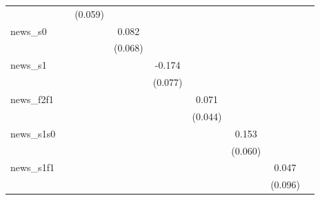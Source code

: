 {\begin{tabular}{l*{8}{c}}
            &                     &     (0.059)         &                     &                     &                     &                     &                     &                     \\
\addlinespace
news\_s0     &                     &                     &       0.082         &                     &                     &                     &                     &                     \\
            &                     &                     &     (0.068)         &                     &                     &                     &                     &                     \\
\addlinespace
news\_s1     &                     &                     &                     &      -0.174\sym{**} &                     &                     &                     &                     \\
            &                     &                     &                     &     (0.077)         &                     &                     &                     &                     \\
\addlinespace
news\_f2f1   &                     &                     &                     &                     &       0.071         &                     &                     &                     \\
            &                     &                     &                     &                     &     (0.044)         &                     &                     &                     \\
\addlinespace
news\_s1s0   &                     &                     &                     &                     &                     &       0.153\sym{**} &                     &                     \\
            &                     &                     &                     &                     &                     &     (0.060)         &                     &                     \\
\addlinespace
news\_s1f1   &                     &                     &                     &                     &                     &                     &       0.047         &                     \\
            &                     &                     &                     &                     &                     &                     &     (0.096)         &                     \\

\end{tabular}}

